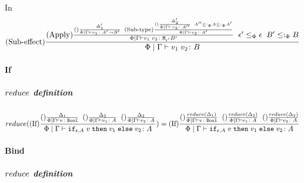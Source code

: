 \documentclass{report}
\begin{document}
        In
        \begin{equation}
            (\text{Sub-effect}) \frac{
                (\text{Apply}) \frac{
                    (\text{}) \frac{
                        \Delta'_1
                    }{
                        \Phi\mid\Gamma \vdash v_1 \colon A'\rightarrow B'
                    }
                \;\;
                    (\text{Sub-type}) \frac{
                        (\text{}) \frac{\Delta'_2}{\Phi\mid\Gamma \vdash v_2 \colon A''}
                        \;\;
                        A'' \leq:_\Phi A \leq:_\Phi A'
                    }{
                        \Phi\mid\Gamma \vdash v_2 \colon A'
                    }
                }{
                    \Phi\mid\Gamma \vdash v_1\; v_2 \colon \texttt{M}_{\epsilon'}{B'}
                }
                \;\;
                \epsilon' \leq_{\Phi} \epsilon
                \;\;
                B' \leq:_\Phi B
            }{
                \Phi\mid\Gamma \vdash v_1\; v_2 \colon B
            }
        \end{equation}
        
        \paragraph{If}
       
        \subparagraph{$reduce$ definition}
            \begin{equation}
                reduce((\text{If}) \frac{
                    (\text{}) \frac{\Delta_1}{\Phi\mid\Gamma \vdash v \colon \texttt{Bool}}
                    \;\;
                    (\text{}) \frac{\Delta_2}{\Phi\mid\Gamma \vdash v_1 \colon A}
                    \;\;
                    (\text{}) \frac{\Delta_3}{\Phi\mid\Gamma \vdash v_2 \colon A}
                }{
                    \Phi\mid\Gamma \vdash \texttt{if}_{\epsilon, A}\; v\; \texttt{then}\; v_1 \;\texttt{else} \; v_2 \colon A
                }) = (\text{If}) \frac{
                    (\text{}) \frac{reduce(\Delta_1)}{\Phi\mid\Gamma \vdash v \colon \texttt{Bool}}
                    \;\;
                    (\text{}) \frac{reduce(\Delta_2)}{\Phi\mid\Gamma \vdash v_1 \colon A}
                    \;\;
                    (\text{}) \frac{reduce(\Delta_3)}{\Phi\mid\Gamma \vdash v_2 \colon A}
                }{
                    \Phi\mid\Gamma \vdash \texttt{if}_{\epsilon, A}\; v\; \texttt{then}\; v_1 \;\texttt{else} \; v_2 \colon A
                }
            \end{equation}

        
    
        \paragraph{Bind}
            \subparagraph{$reduce$ definition}
\end{document}
